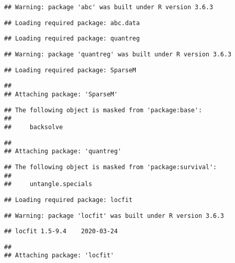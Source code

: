 \documentclass[
]{article}
\begin{document}
\begin{verbatim}
## Warning: package 'abc' was built under R version 3.6.3
\end{verbatim}

\begin{verbatim}
## Loading required package: abc.data
\end{verbatim}

\begin{verbatim}
## Loading required package: quantreg
\end{verbatim}

\begin{verbatim}
## Warning: package 'quantreg' was built under R version 3.6.3
\end{verbatim}

\begin{verbatim}
## Loading required package: SparseM
\end{verbatim}

\begin{verbatim}
## 
## Attaching package: 'SparseM'
\end{verbatim}

\begin{verbatim}
## The following object is masked from 'package:base':
## 
##     backsolve
\end{verbatim}

\begin{verbatim}
## 
## Attaching package: 'quantreg'
\end{verbatim}

\begin{verbatim}
## The following object is masked from 'package:survival':
## 
##     untangle.specials
\end{verbatim}

\begin{verbatim}
## Loading required package: locfit
\end{verbatim}

\begin{verbatim}
## Warning: package 'locfit' was built under R version 3.6.3
\end{verbatim}

\begin{verbatim}
## locfit 1.5-9.4    2020-03-24
\end{verbatim}

\begin{verbatim}
## 
## Attaching package: 'locfit'
\end{verbatim}
\end{document}
